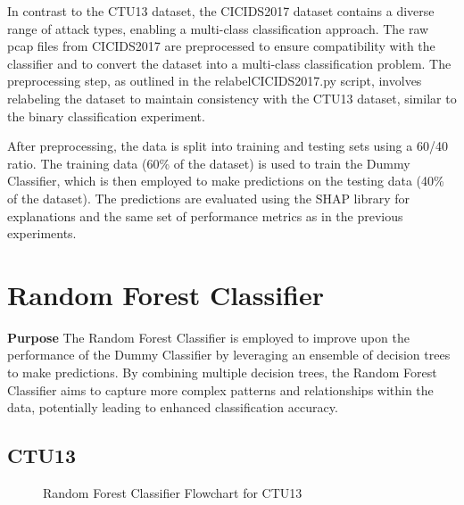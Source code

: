 In contrast to the CTU13 dataset, the CICIDS2017 dataset contains a diverse range of attack types, enabling a multi-class classification approach. The raw pcap files from CICIDS2017 are preprocessed to ensure compatibility with the classifier and to convert the dataset into a multi-class classification problem. The preprocessing step, as outlined in the relabelCICIDS2017.py script, involves relabeling the dataset to maintain consistency with the CTU13 dataset, similar to the binary classification experiment.

After preprocessing, the data is split into training and testing sets using a 60/40 ratio. The training data (60\% of the dataset) is used to train the Dummy Classifier, which is then employed to make predictions on the testing data (40\% of the dataset). The predictions are evaluated using the SHAP library for explanations and the same set of performance metrics as in the previous experiments.

\section{Random Forest Classifier}\label{sec:RandomForestClassifier}
\textbf{Purpose} The Random Forest Classifier is employed to improve upon the performance of the Dummy Classifier by leveraging an ensemble of decision trees to make predictions. By combining multiple decision trees, the Random Forest Classifier aims to capture more complex patterns and relationships within the data, potentially leading to enhanced classification accuracy.

\subsection{CTU13}
\begin{figure}[H]
\centering
{}
\caption{Random Forest Classifier Flowchart for CTU13}\label{fig:RandomForestFlowCTU13}
\end{figure}

